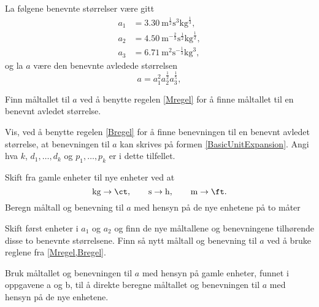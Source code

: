 \documentclass[a4paper,11pt]{article}
\begin{document}
\begin{problem}[3]
    La følgene benevnte størrelser være gitt
    \begin{align*}
      a_1 &= \SI{3.30}{\m\tothe{\frac{1}{2}}%
                                \s\cubed%
                                \kg\tothe{\frac{1}{3}}},\\
      a_2 &= \SI{4.50}{\m\tothe{-\frac{2}{3}}%
                                \s\tothe{\frac{1}{2}}%
                                \kg\tothe{\frac{1}{2}}},\\
      a_3 &= \SI{6.71}{\m\squared%
                                 \s\tothe{-\frac{1}{3}}\kg\cubed},
    \end{align*}
    og la $a$ være den benevnte avledede størrelsen
    \begin{equation*}
      a = a_1^2 a_2^{\tfrac{1}{2}} a_3^{\tfrac{1}{5}},
    \end{equation*}
\end{problem}
\vspace{-0.5cm}
\begin{subproblem}
    Finn måltallet til $a$ ved å benytte
    regelen \eqref{Mregel} for å finne måltallet til en benevnt avledet
    størrelse.
\end{subproblem}
\vspace{-0.25cm}
\begin{subproblem}
    Vis, ved å benytte regelen \eqref{Bregel} for å finne
    benevningen til en benevnt avledet størrelse, at benevningen til
    $a$ kan skrives på formen \eqref{BasicUnitExpansion}. Angi hva
    $k$, $d_1,\dots,d_k$ og $p_1,\dots, p_k$ er i dette tilfellet.
\end{subproblem}
\vspace{-0.25cm}
\begin{subproblem}
    Skift fra gamle enheter til nye enheter ved at
    \begin{equation*}
      \si{\kg} \rightarrow \si{\ct}, \qquad
      \si{\s} \rightarrow \si{\hour}, \qquad
      \si{\m} \rightarrow \si{\ft}.
    \end{equation*}
    Beregn måltall og benevning til $a$ med hensyn på de nye
    enhetene på to måter
    \begin{subsubproblem}
        \label{subsubproblem:MAT-0001-Exercise-03-Problem-N-2.6.6.1-c-i}
        Skift først enheter i $a_1$ og $a_2$ og finn de nye måltallene
        og benevningene tilhørende disse to benevnte størrelsene. Finn så
        nytt måltall og benevning til $a$ ved å bruke reglene fra \cref{Mregel,Bregel}.
    \end{subsubproblem}
    \begin{subsubproblem}
        \label{subsubproblem:MAT-0001-Exercise-03-Problem-N-2.6.6.1-c-ii}
        Bruk måltallet og benevningen til $a$ med hensyn på gamle
        enheter, funnet i oppgavene a og b, til å direkte beregne måltallet
        og benevningen til $a$ med hensyn på de nye enhetene.
    \end{subsubproblem}
\end{subproblem}
\end{document}
